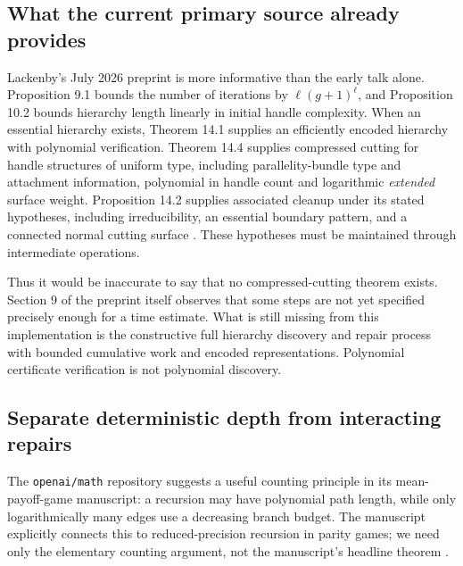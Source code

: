 \documentclass[11pt]{article}
\theoremstyle{definition}
\theoremstyle{remark}
\newcommand{\code}[1]{\texttt{#1}}
\begin{document}
\subsection{What the current primary source already provides}
Lackenby's July 2026 preprint is more informative than the early talk alone. Proposition 9.1 bounds the number of iterations by $\ell(g+1)^\ell$, and Proposition 10.2 bounds hierarchy length linearly in initial handle complexity. When an essential hierarchy exists, Theorem 14.1 supplies an efficiently encoded hierarchy with polynomial verification. Theorem 14.4 supplies compressed cutting for handle structures of uniform type, including parallelity-bundle type and attachment information, polynomial in handle count and logarithmic \emph{extended} surface weight. Proposition 14.2 supplies associated cleanup under its stated hypotheses, including irreducibility, an essential boundary pattern, and a connected normal cutting surface \cite{lackenby2026}. These hypotheses must be maintained through intermediate operations.

Thus it would be inaccurate to say that no compressed-cutting theorem exists. Section 9 of the preprint itself observes that some steps are not yet specified precisely enough for a time estimate. What is still missing from this implementation is the constructive full hierarchy discovery and repair process with bounded cumulative work and encoded representations. Polynomial certificate verification is not polynomial discovery.

\subsection{Separate deterministic depth from interacting repairs}
The \code{openai/math} repository suggests a useful counting principle in its mean-payoff-game manuscript: a recursion may have polynomial path length, while only logarithmically many edges use a decreasing branch budget. The manuscript explicitly connects this to reduced-precision recursion in parity games; we need only the elementary counting argument, not the manuscript's headline theorem \cite{openai104,parys}.
\end{document}
